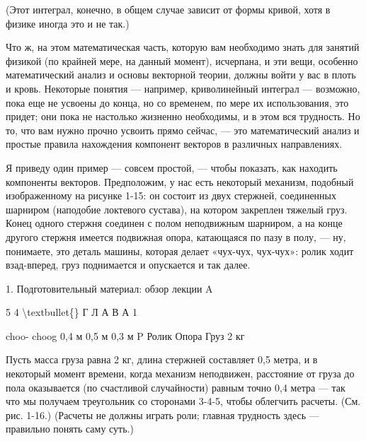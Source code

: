 \documentclass[10pt,oneside]{article}
\newcommand{\TipsRunning}[1]{\par\vspace{2bp}{\centering\footnotesize #1\par}\vspace{2bp}}
\newcommand{\TipsSubsection}[1]{\par\vspace{6bp}{\normalsize\bfseries #1\par}\vspace{2bp}}
\begin{document}
(Этот интеграл, конечно, в общем случае зависит от формы кривой, хотя в физике иногда это и не так.)\par

Что ж, на этом математическая часть, которую вам необходимо знать для занятий физикой (по крайней мере, на данный момент), исчерпана, и эти вещи, особенно математический анализ и основы векторной теории, должны войти у вас в плоть и кровь. Некоторые понятия --- например, криволинейный интеграл --- возможно, пока еще не усвоены до конца, но со временем, по мере их использования, это придет; они пока не настолько жизненно необходимы, и в этом вся трудность. Но то, что вам нужно прочно усвоить прямо сейчас, --- это математический анализ и простые правила нахождения компонент векторов в различных направлениях.\par

\TipsSubsection{1-9 Простой пример}

Я приведу один пример --- совсем простой, --- чтобы показать, как находить компоненты векторов. Предположим, у нас есть некоторый механизм, подобный изображенному на рисунке 1-15: он состоит из двух стержней, соединенных шарниром (наподобие локтевого сустава), на котором закреплен тяжелый груз. Конец одного стержня соединен с полом неподвижным шарниром, а на конце другого стержня имеется подвижная опора, катающаяся по пазу в полу, --- ну, понимаете, это деталь машины, которая делает «чух-чух, чух-чух»: ролик ходит взад-вперед, груз поднимается и опускается и так далее.\par

1. Подготовительный материал: обзор лекции A\par

5 4 \textbackslash{}textbullet\{\} Г Л А В А  1\par

choo- choog 0,4 м 0,5 м 0,3 м P Ролик Опора Груз 2 кг\par

\TipsRunning{Р И С У Н О К  1 - 1 6 Какая сила P требуется, чтобы удержать груз?}

\TipsRunning{Р И С У Н О К  1 - 1 5 Простой механизм.}

Пусть масса груза равна 2 кг, длина стержней составляет 0,5 метра, и в некоторый момент времени, когда механизм неподвижен, расстояние от груза до пола оказывается (по счастливой случайности) равным точно 0,4 метра --- так что мы получаем треугольник со сторонами 3-4-5, чтобы облегчить расчеты. (См. рис. 1-16.) (Расчеты не должны играть роли; главная трудность здесь --- правильно понять саму суть.)\par
\end{document}
